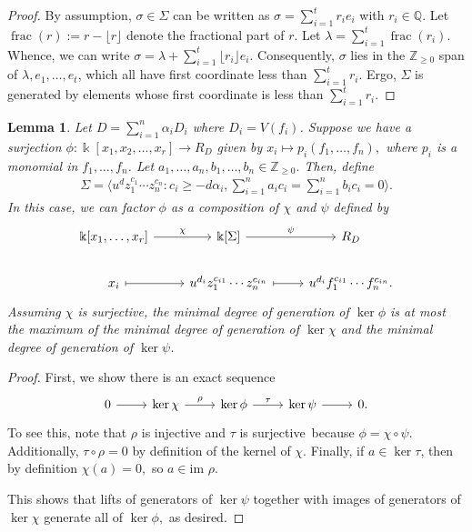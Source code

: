 \documentclass{amsart}
\theoremstyle{plain}
\newtheorem{lem}[thm]{Lemma}
\theoremstyle{definition}
\theoremstyle{remark}
\numberwithin{equation}{section}
\newcommand\bq{{\mathbb Q}}
\newcommand\bz{{\mathbb Z}}
\newcommand\bk{{\Bbbk}}
\newcommand\im{\text{im }}
\newcommand\bida{a}
\newcommand\bidb{b}
\DeclareMathOperator{\fr}{frac}
\begin{document}
\begin{proof}
By assumption, $\sigma \in \Sigma$ can be written as $\sigma = \sum_
{i = 1}^{t} r_i e_i$ with $r_i \in \bq$. Let $\fr(r) := r - \lfloor r
\rfloor$ denote the fractional part of $r$. Let $\lambda = \sum_{i = 1}
^{t} \fr(r_i)$. Whence, we can write $\sigma = \lambda + \sum_{i = 1}
^{t} \lfloor r_i \rfloor e_i.$ Consequently, $\sigma$ lies in the
$\bz_{\geq 0}$ span of $\lambda, e_1, \ldots, e_t$, which all have
first coordinate less than $\sum_{i=1}^{t} r_i$. Ergo, $\Sigma$ is
generated by elements whose first coordinate is less than
$\sum_{i = 1}^{t} r_i$.
\end{proof}


\begin{lem}
\label{lem:composite-map}
Let $D = \sum_{i=1}^{n}\alpha_i D_i$ where $D_i = V(f_i)$. Suppose we have a
surjection $\phi: \bk[x_1,x_2,\ldots, x_r] \rightarrow R_D$ given by $x_i
\mapsto p_i(f_1, \ldots, f_n),$ where $p_i$ is a monomial in $f_1,\ldots, f_n$.
Let $\bida_1, \ldots, \bida_n, \bidb_1, \ldots, \bidb_n \in \bz_{\geq 0}.$
Then, define
\begin{align*}
	\Sigma = \langle u^d z_1^{c_1} \cdots z_n^{c_n} : c_i \geq -d \alpha_i, \sum_{i=1}^{n} \bida_i c_i = \sum_{i=1}^{n} \bidb_i c_i = 0 \rangle. 
\end{align*}
In this case, we can factor $\phi$ as a composition of $\chi$ and $\psi$ defined by
\[
\begin{tikzcd}
\bk[x_1,\ldots, x_r] \ar {r}{\chi} & \bk[\Sigma] \ar {r}{\psi} & R_D \\
x_i \arrow[mapsto]{r} & u^{d_i}z_1^{c_{i1}} \cdots z_n^{c_{in}} \arrow[mapsto]{r} & u^{d_i}f_1^{c_{i1}} \cdots f_n^{c_{in}}.
\end{tikzcd}
\]
Assuming $\chi$ is surjective, the minimal degree of generation of $\ker \phi$
is at most the maximum of the minimal degree of generation of $\ker \chi$ and
the minimal degree of generation of $\ker \psi$.
\end{lem}
\begin{proof}
First, we show there is an exact sequence
\[
\begin{tikzcd}
0 \ar {r} & \ker \chi \ar{r}{\rho} & \ker \phi \ar {r}{\tau} & \ker \psi \ar r & 0.
\end{tikzcd}
\]
To see this, note that $\rho$ is injective and $\tau$ is surjective\ because
$\phi = \chi \circ \psi$. Additionally, $\tau \circ \rho = 0$ by definition of
the kernel of $\chi$. Finally, if $a \in\ker \tau$, then by definition $\chi(a)
= 0,$ so $a \in \im \rho$.

This shows that lifts of generators of $\ker \psi$ together with images of
generators of $\ker \chi$ generate all of $\ker \phi,$ as desired. 
\end{proof}
\end{document}
